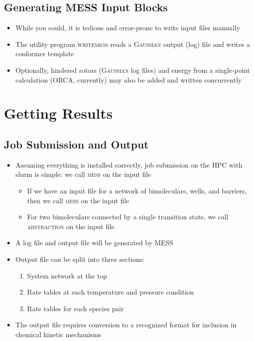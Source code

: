\documentclass[a4paper,10pt]{article}
\begin{document}
\subsection{Generating \textsc{MESS} Input Blocks}
  \begin{itemize}
   \item While you could, it is tedious and error-prone to write input files manually
   \item The utility program \textsc{writemess} reads a \textsc{Gaussian} output (log) file and writes a conformer template
   \item Optionally, hindered rotors (\textsc{Gaussian} log files) and energy from a single-point calculation (\textsc{ORCA}, currently) may also be added and written concurrently
  \end{itemize}


\section{Getting Results}
\subsection{Job Submission and Output}
  \begin{itemize}
   \item Assuming everything is installed correctly, job submission on the HPC with slurm is simple: we call \textsc{mess} on the input file
   \begin{itemize}
    \item If we have an input file for a network of bimoleculars, wells, and barriers, then we call \textsc{mess} on the input file
    \item For two bimoleculars connected by a single transition state, we call \textsc{abstraction} on the input file
   \end{itemize}
   \item A log file and output file will be generated by \textsc{MESS}
   \item Output file can be split into three sections:
    \begin{enumerate}
     \item System network at the top
     \item Rate tables at each temperature and pressure condition
     \item Rate tables for each species pair
    \end{enumerate}
   \item The output file requires conversion to a recognized format for inclusion in chemical kinetic mechanisms
  \end{itemize}
\end{document}
